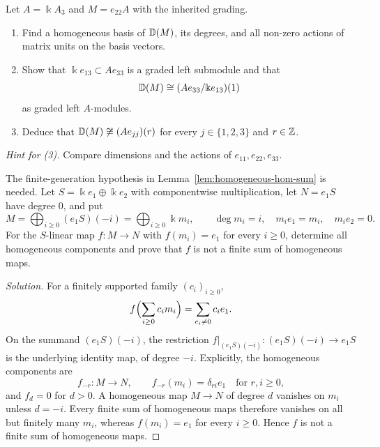 \begin{exercise}
Let $A=\Bbbk A_3$ and $M=e_{22}A$ with the inherited grading.
\begin{enumerate}
\item Find a homogeneous basis of $\mathbb{D}(M)$, its degrees, and all non-zero actions of matrix units on the basis vectors.
\item Show that $\Bbbk e_{13}\subset Ae_{33}$ is a graded left submodule and that
\[
\mathbb{D}(M)\cong(Ae_{33}/\Bbbk e_{13})(1)
\]
as graded left $A$-modules.
\item Deduce that $\mathbb{D}(M)\not\cong(Ae_{jj})(r)$ for every $j\in\{1,2,3\}$ and $r\in\mathbb{Z}$.
\end{enumerate}
\emph{Hint for (3).} Compare dimensions and the actions of $e_{11},e_{22},e_{33}$.
\end{exercise}

\begin{exercise}\label{ex:infinite-hom}
The finite-generation hypothesis in Lemma~\ref{lem:homogeneous-hom-sum} is needed.
Let $S=\Bbbk e_1\oplus\Bbbk e_2$ with componentwise multiplication, let $N=e_1S$ have degree $0$, and put
\[
M=\bigoplus_{i\geq0}(e_1S)(-i)=\bigoplus_{i\geq0}\Bbbk m_i,
\qquad \deg m_i=i,\quad m_i e_1=m_i,\quad m_i e_2=0.
\]
For the $S$-linear map $f:M\to N$ with $f(m_i)=e_1$ for every $i\geq0$, determine all homogeneous components and prove that $f$ is not a finite sum of homogeneous maps.
\end{exercise}

\begin{hidden}
\begin{proof}[Solution]
For a finitely supported family $(c_i)_{i\geq0}$,
\[
f\Bigl(\sum_{i\geq0}c_i m_i\Bigr)=\sum_{c_i\neq0}c_i e_1.
\]
On the summand $(e_1S)(-i)$, the restriction $f|_{(e_1S)(-i)}:(e_1S)(-i)\to e_1S$ is the underlying identity map, of degree $-i$.
Explicitly, the homogeneous components are
\[
f_{-r}:M\longrightarrow N,\qquad f_{-r}(m_i)=\delta_{ri}e_1
\quad\text{for }r,i\geq0,
\]
and $f_d=0$ for $d>0$.
A homogeneous map $M\to N$ of degree $d$ vanishes on $m_i$ unless $d=-i$.
Every finite sum of homogeneous maps therefore vanishes on all but finitely many $m_i$, whereas $f(m_i)=e_1$ for every $i\geq0$.
Hence $f$ is not a finite sum of homogeneous maps.
\end{proof}
\end{hidden}

